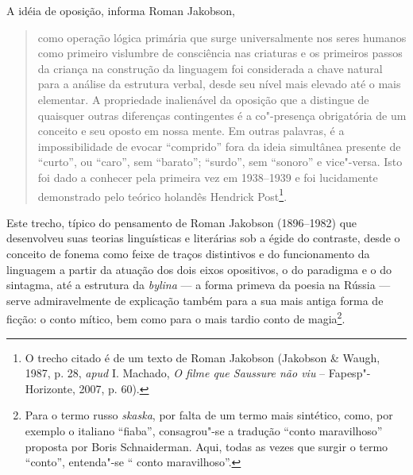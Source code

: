 A idéia de oposição, informa Roman Jakobson,

\begin{quote}
como operação lógica primária que surge
universalmente nos seres humanos como primeiro vislumbre de consciência
nas criaturas e os primeiros passos da criança na construção da
linguagem foi considerada a chave natural para a análise da estrutura
verbal, desde seu nível mais elevado até o mais elementar. A propriedade
inalienável da oposição que a distingue de quaisquer outras diferenças
contingentes é a co"-presença obrigatória de um conceito e seu oposto em
nossa mente. Em outras palavras, é a impossibilidade de evocar ``comprido'' fora da ideia simultânea presente de ``curto'', ou ``caro'',
sem ``barato''; ``surdo'', sem ``sonoro'' e vice"-versa. Isto foi dado
a conhecer pela primeira vez em 1938--1939 e foi lucidamente demonstrado
pelo teórico holandês Hendrick Post\footnote{O trecho citado é de um texto de Roman Jakobson (Jakobson \& Waugh, 1987, p.
  28, \emph{apud} I. Machado, \emph{O filme que Saussure não viu} -- Fapesp"-Horizonte, 2007, p. 60).}.
\end{quote}



Este trecho, típico do pensamento de Roman Jakobson (1896--1982) que
desenvolveu suas teorias linguísticas e literárias sob a égide do
contraste, desde o conceito de fonema como feixe de traços distintivos e
do funcionamento da linguagem a partir da atuação dos dois eixos
opositivos, o do paradigma e o do sintagma, até a estrutura
da \emph{bylina} --- a forma primeva da poesia na Rússia --- serve
admiravelmente de explicação também para a sua mais antiga forma de
ficção: o conto mítico, bem como para o mais tardio conto de
magia\footnote{Para o termo russo \emph{skaska}, por falta de um termo
  mais sintético, como, por exemplo o italiano ``fiaba'', consagrou"-se
  a tradução ``conto maravilhoso'' proposta por Boris Schnaiderman. Aqui, todas as vezes que surgir o termo ``conto'', entenda"-se ``
  conto maravilhoso''.}.


